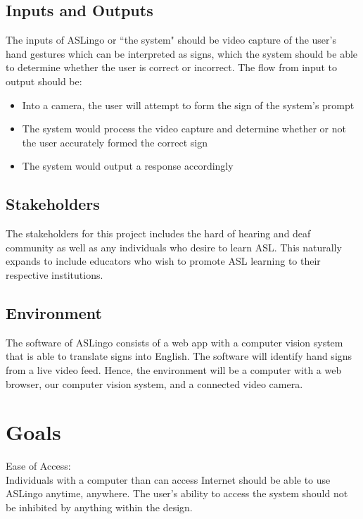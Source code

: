 \documentclass{article}
\begin{document}
\subsection{Inputs and Outputs}

The inputs of ASLingo or ``the system" should be video capture of the user's hand gestures which can be interpreted as signs, which the system should be able to determine whether the user is correct or incorrect. The flow from input to output should be:

\begin{itemize}
    \item Into a camera, the user will attempt to form the sign of the system's prompt
    \item The system would process the video capture and determine whether or not the user accurately formed the correct sign
    \item The system would output a response accordingly
\end{itemize}

\subsection{Stakeholders}

The stakeholders for this project includes the hard of hearing and deaf community as well as any individuals who desire to learn ASL. This naturally expands to include educators who wish to promote ASL learning to their respective institutions.

\subsection{Environment}

The software of ASLingo consists of a web app with a computer vision system that is able to translate signs into English. The software will identify hand signs from a live video feed. Hence, the environment will be a computer with a web browser, our computer vision system, and a connected video camera.

\section{Goals}

Ease of Access:\\
Individuals with a computer than can access Internet should be able to use ASLingo anytime, anywhere. The user's ability to access the system should not be inhibited by anything within the design.
\end{document}
